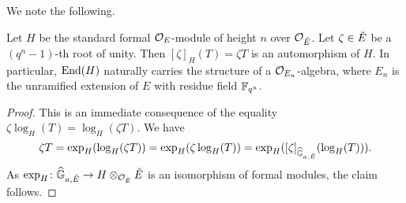 \documentclass[../main.tex]{subfiles}
\begin{document}
We note the following. 
\begin{lem}\label{lem:MultByROUForStandardModule}
  Let $H$ be the standard formal $\mathcal{O}_E$-module of height $n$ over 
  $\mathcal{O}_{\breve {E}}$. 
  Let $\zeta \in {\breve {E}}$ be a $(q^n-1)$-th root of unity. Then 
  $[\zeta]_H(T) = \zeta T$ is an automorphism of $H$. In particular,
  $\operatorname{End}(H)$ naturally carries the structure of a $\mathcal{O}_{E_n}$-algebra,
  where $E_n$ is the unramified extension of $E$ with residue field
  $\mathbb{F}_{q^n}$. 
\begin{proof}
  This is an immediate consequence of the equality $\zeta \log_H(T)
  = \log_H(\zeta T)$. We have
  \begin{equation*}
    \zeta T = \exp_H(\log_H(\zeta T)) = \exp_H(\zeta \log_H(T)) = \exp_H
    ([\zeta]_{\widehat{\mathbb{G}}_{a, {\breve {E}}}}(\log_H(T))).
  \end{equation*}
  As $\exp_H\colon  \widehat{\mathbb{G}}_{a, {\breve {E}}} \to H \otimes_{\mathcal{O}_{\breve {E}}} {\breve {E}}$ is an isomorphism of 
  formal modules, the claim follows.
\end{proof}
\end{lem}
\end{document}

